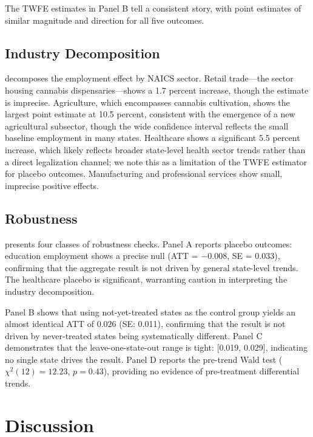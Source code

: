 \documentclass[12pt]{article}
\begin{document}
The TWFE estimates in Panel B tell a consistent story, with point estimates of similar magnitude and direction for all five outcomes.

\subsection{Industry Decomposition}



 decomposes the employment effect by NAICS sector. Retail trade---the sector housing cannabis dispensaries---shows a 1.7 percent increase, though the estimate is imprecise. Agriculture, which encompasses cannabis cultivation, shows the largest point estimate at 10.5 percent, consistent with the emergence of a new agricultural subsector, though the wide confidence interval reflects the small baseline employment in many states. Healthcare shows a significant 5.5 percent increase, which likely reflects broader state-level health sector trends rather than a direct legalization channel; we note this as a limitation of the TWFE estimator for placebo outcomes. Manufacturing and professional services show small, imprecise positive effects.

\subsection{Robustness}



 presents four classes of robustness checks. Panel A reports placebo outcomes: education employment shows a precise null (ATT = $-0.008$, SE = 0.033), confirming that the aggregate result is not driven by general state-level trends. The healthcare placebo is significant, warranting caution in interpreting the industry decomposition.

Panel B shows that using not-yet-treated states as the control group yields an almost identical ATT of 0.026 (SE: 0.011), confirming that the result is not driven by never-treated states being systematically different. Panel C demonstrates that the leave-one-state-out range is tight: [0.019, 0.029], indicating no single state drives the result. Panel D reports the pre-trend Wald test ($\chi^2(12) = 12.23$, $p = 0.43$), providing no evidence of pre-treatment differential trends.

\section{Discussion}
\end{document}
